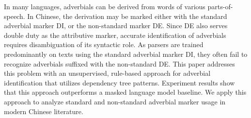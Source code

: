 In many languages, adverbials can be derived from words of various parts-of-speech. In Chinese, the derivation may be marked either with the standard adverbial marker DI, or the non-standard marker DE. Since DE also serves double duty as the attributive marker, accurate identification of adverbials requires disambiguation of its syntactic role. As parsers are trained predominantly on texts using the standard adverbial marker DI, they often fail to recognize adverbials suffixed with the non-standard DE.  This paper addresses this problem with an unsupervised, rule-based approach for adverbial identification that utilizes dependency tree patterns. Experiment results show that this approach outperforms a masked language model baseline. We apply this approach to analyze standard and non-standard adverbial marker usage in modern Chinese literature.
